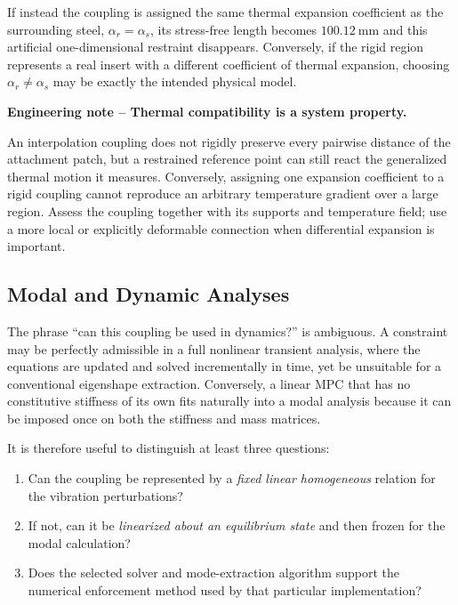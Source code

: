 If instead the coupling is assigned the same thermal expansion coefficient as
the surrounding steel, $\alpha_r=\alpha_s$, its stress-free length becomes
$100.12~\mathrm{mm}$ and this artificial one-dimensional restraint disappears.
Conversely, if the rigid region represents a real insert with a different
coefficient of thermal expansion, choosing $\alpha_r\neq\alpha_s$ may be exactly
the intended physical model.

\begin{bbox}
\textbf{Engineering note -- Thermal compatibility is a system property.}

An interpolation coupling does not rigidly preserve every pairwise distance of
the attachment patch, but a restrained reference point can still react the
generalized thermal motion it measures. Conversely, assigning one expansion
coefficient to a rigid coupling cannot reproduce an arbitrary temperature
gradient over a large region. Assess the coupling together with its supports and
temperature field; use a more local or explicitly deformable connection when
differential expansion is important.
\end{bbox}

\subsection{Modal and Dynamic Analyses}\label{sec:coupling-modal-dynamics}

The phrase ``can this coupling be used in dynamics?'' is ambiguous. A
constraint may be perfectly admissible in a full nonlinear transient analysis,
where the equations are updated and solved incrementally in time, yet be
unsuitable for a conventional eigenshape extraction. Conversely, a linear MPC
that has no constitutive stiffness of its own fits naturally into a modal
analysis because it can be imposed once on both the stiffness and mass matrices.

It is therefore useful to distinguish at least three questions:

\begin{enumerate}
    \item Can the coupling be represented by a \emph{fixed linear homogeneous}
          relation for the vibration perturbations?
    \item If not, can it be \emph{linearized about an equilibrium state} and
          then frozen for the modal calculation?
    \item Does the selected solver and mode-extraction algorithm support the
          numerical enforcement method used by that particular implementation?
\end{enumerate}

